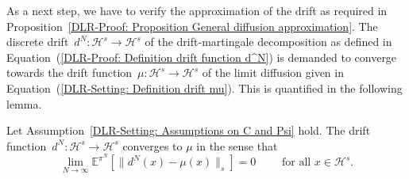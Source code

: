 As a next step, we have to verify the approximation of the drift as required in Proposition~\ref{DLR-Proof: Proposition General diffusion approximation}. The discrete drift~$d^N : \mathcal{H}^s \to \mathcal{H}^s$ of the drift-martingale decomposition as defined in Equation~(\ref{DLR-Proof: Definition drift function d^N}) is demanded to converge towards the drift function~$\mu : \mathcal{H}^s \to \mathcal{H}^s$ of the limit diffusion given in Equation~(\ref{DLR-Setting: Definition drift mu}). This is quantified in the following lemma.

\begin{lemma}\autocite[Lemma 4.7]{Pillai2012}
  \label{DLR: Lemma Dirft approximation}
  Let Assumption~\ref{DLR-Setting: Assumptions on C and Psi} hold. The drift function~$d^N : \mathcal{H}^s \to \mathcal{H}^s$ converges to $\mu$ in the sense that
     \begin{equation*}
      \lim_{N \to \infty} \mathbb{E}^{\pi^N}[ \|  d^N(x) - \mu(x) \|_{s} ] = 0 \qquad \text{ for all } x \in \mathcal{H}^s.
    \end{equation*}
\end{lemma}

